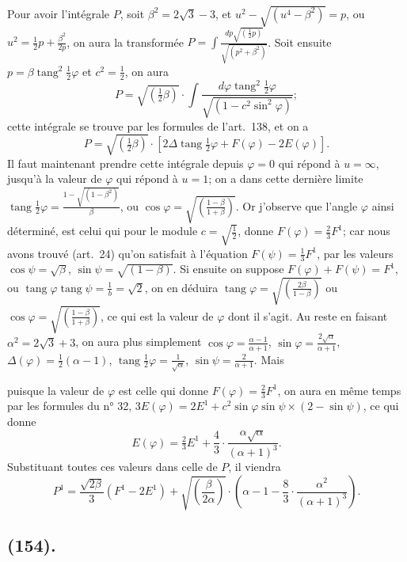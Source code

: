 \documentclass{article}
\begin{document}
Pour avoir l'intégrale $P$, soit $\beta^{2}=2\sqrt{3}-3$, et $u^{2}-\sqrt{(u^{4}-\beta^{2})}=p$, ou $u^{2}=\frac{1}{2}p+\frac{\beta^{2}}{2p}$, on aura la transformée $P=\displaystyle\int\frac{dp\sqrt{(\frac{1}{2}p)}}{\sqrt{(p^{2}+\beta^{2})}}$. Soit ensuite $p=\beta\operatorname{tang}^{2}\frac{1}{2}\varphi$ et $c^{2}=\frac{1}{2}$, on aura
\[ P=\sqrt{(\tfrac{1}{2}\beta)}\cdot\int\frac{d\varphi\operatorname{tang}^{2}\tfrac{1}{2}\varphi}{\sqrt{(1-c^{2}\sin^{2}\varphi)}}; \]
cette intégrale se trouve par les formules de l'art.\ 138, et on a
\[ P=\sqrt{(\tfrac{1}{2}\beta)}\cdot[2\Delta\operatorname{tang}\tfrac{1}{2}\varphi+F(\varphi)-2E(\varphi)]. \]
Il faut maintenant prendre cette intégrale depuis $\varphi=0$ qui répond à $u=\infty$, jusqu'à la valeur de $\varphi$ qui répond à $u=1$; on a dans cette dernière limite $\operatorname{tang}\frac{1}{2}\varphi=\frac{1-\sqrt{(1-\beta^{2})}}{\beta}$, ou $\cos\varphi=\sqrt{\left(\frac{1-\beta}{1+\beta}\right)}$. Or j'observe que l'angle $\varphi$ ainsi déterminé, est celui qui pour le module $c=\sqrt{\frac{1}{2}}$, donne $F(\varphi)=\frac{2}{3}F^{1}$; car nous avons trouvé (art.\ 24) qu'on satisfait à l'équation $F(\psi)=\frac{1}{3}F^{1}$, par les valeurs $\cos\psi=\sqrt{\beta}$, $\sin\psi=\sqrt{(1-\beta)}$. Si ensuite on suppose $F(\varphi)+F(\psi)=F^{1}$, ou $\operatorname{tang}\varphi\operatorname{tang}\psi=\frac{1}{b}=\sqrt{2}$, on en déduira $\operatorname{tang}\varphi=\sqrt{\left(\frac{2\beta}{1-\beta}\right)}$ ou $\cos\varphi=\sqrt{\left(\frac{1-\beta}{1+\beta}\right)}$, ce qui est la valeur de $\varphi$ dont il s'agit. Au reste en faisant $\alpha^{2}=2\sqrt{3}+3$, on aura plus simplement $\cos\varphi=\frac{\alpha-1}{\alpha+1}$, $\sin\varphi=\frac{2\sqrt{\alpha}}{\alpha+1}$, $\Delta(\varphi)=\frac{1}{2}(\alpha-1)$, $\operatorname{tang}\frac{1}{2}\varphi=\frac{1}{\sqrt{\alpha}}$, $\sin\psi=\frac{2}{\alpha+1}$. Mais

puisque la valeur de $\varphi$ est celle qui donne $F(\varphi)=\frac{2}{3}F^{1}$, on aura en même temps par les formules du n° 32, $3E(\varphi)=2E^{1}+c^{2}\sin\varphi\sin\psi\times(2-\sin\psi)$, ce qui donne
\[ E(\varphi)=\tfrac{2}{3}E^{1}+\frac{4}{3}\cdot\frac{\alpha\sqrt{\alpha}}{(\alpha+1)^{3}}. \]
Substituant toutes ces valeurs dans celle de $P$, il viendra
\[ P^{1}=\frac{\sqrt{2\beta}}{3}(F^{1}-2E^{1})+\sqrt{\left(\frac{\beta}{2\alpha}\right)}\cdot\left(\alpha-1-\frac{8}{3}\cdot\frac{\alpha^{2}}{(\alpha+1)^{3}}\right). \]

\subsection*{(154).}
\end{document}
